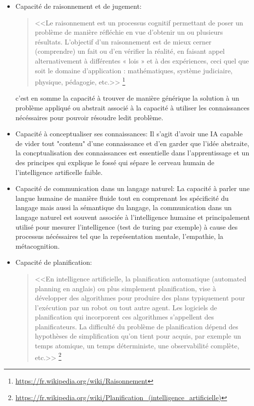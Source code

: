 \begin{itemize}
    \item Capacité de raisonnement et de jugement:
    \begin{quotation}
    <<Le raisonnement est un processus cognitif permettant
    de poser un problème de manière réfléchie en vue d'obtenir un ou plusieurs résultats.
    L'objectif d'un raisonnement est de mieux cerner (comprendre) un fait ou d'en vérifier la réalité,
    en faisant appel alternativement à différentes « lois » et à des expériences,
    ceci quel que soit le domaine d'application : mathématiques, système judiciaire,
    physique, pédagogie, etc.>>
    \footnote{\url{https://fr.wikipedia.org/wiki/Raisonnement}}
    \end{quotation}

    c'est en somme la capacité à trouver de manière générique la solution à un problème appliqué
    ou abstrait associé à la capacité à utiliser les connaissances nécéssaires pour pouvoir
    résoudre ledit problème.
    \newline

    \item Capacité à conceptualiser ses connaissances: \newline
    Il s'agit d'avoir une IA capable de vider tout "contenu" d'une connaissance et d'en garder
    que l'idée abstraite, la concptualisation des connaissances est essentielle dans l'apprentissage
    et un des principes qui explique le fossé qui sépare le cerveau humain de l'intelligence
    artificelle faible. %
    \newline


    \item Capacité de communication dans un langage naturel: \newline
    La capacité à parler une langue humaine de manière fluide
    tout en comprenant les spécificité du langage mais aussi la sémantique du langage,
    la communication dans un langage naturel est souvent associée à l'intelligence humaine
    et principalement utilisé pour mesurer l'intelligence (test de turing par exemple)
    à cause des processus nécéssaires tel que la représentation mentale, l'empathie,
    la métacognition.
    \newline


    \item Capacité de planification:
    \begin{quotation}
        <<En intelligence artificielle, la planification automatique
    (automated planning en anglais) ou plus simplement planification, vise à développer des
    algorithmes pour produire des plans typiquement pour l'exécution par un robot ou tout autre agent.
    Les logiciels de planification qui incorporent ces algorithmes s'appellent des planificateurs.
    La difficulté du problème de planification dépend des hypothèses de simplification qu'on tient
    pour acquis, par exemple un temps atomique, un temps déterministe, une observabilité complète, etc.>>
    \footnote{\url{https://fr.wikipedia.org/wiki/Planification_(intelligence_artificielle)}}
    \end{quotation}


\end{itemize}
